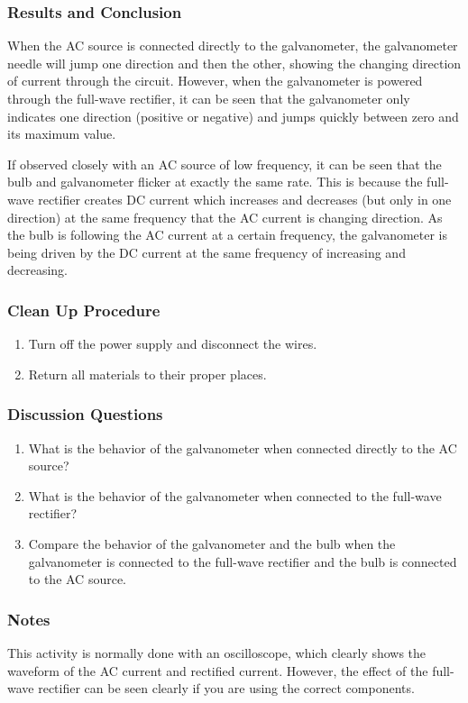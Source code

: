 \subsubsection*{Results and Conclusion}
When the AC source is connected directly to the galvanometer, the galvanometer needle will jump one direction and then the other, showing the changing direction of current through the circuit.  However, when the galvanometer is powered through the full-wave rectifier, it can be seen that the galvanometer only indicates one direction (positive or negative) and jumps quickly between zero and its maximum value.

If observed closely with an AC source of low frequency, it can be seen that the bulb and galvanometer flicker at exactly the same rate.  This is because the full-wave rectifier creates DC current which increases and decreases (but only in one direction) at the same frequency that the AC current is changing direction.  As the bulb is following the AC current at a certain frequency, the galvanometer is being driven by the DC current at the same frequency of increasing and decreasing.

\subsubsection*{Clean Up Procedure}
\begin{enumerate}
\item{Turn off the power supply and disconnect the wires.}
\item{Return all materials to their proper places.}
\end{enumerate}

\subsubsection*{Discussion Questions}
\begin{enumerate}
\item{What is the behavior of the galvanometer when connected directly to the AC source?}
\item{What is the behavior of the galvanometer when connected to the full-wave rectifier?}
\item{Compare the behavior of the galvanometer and the bulb when the galvanometer is connected to the full-wave rectifier and the bulb is connected to the AC source.}
\end{enumerate}

\subsubsection*{Notes}
This activity is normally done with an oscilloscope, which clearly shows the waveform of the AC current and rectified current.  However, the effect of the full-wave rectifier can be seen clearly if you are using the correct components.

